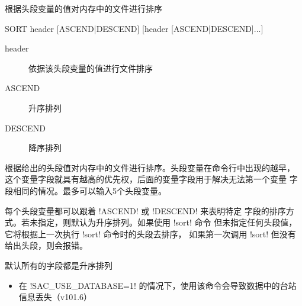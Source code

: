 \label{cmd:sort}

根据头段变量的值对内存中的文件进行排序

\begin{SACSTX}
SORT header [ASCEND|DESCEND] [header [ASCEND|DESCEND]...]
\end{SACSTX}

\begin{description}
\item [header] 依据该头段变量的值进行文件排序
\item [ASCEND] 升序排列
\item [DESCEND] 降序排列
\end{description}

根据给出的头段值对内存中的文件进行排序。头段变量在命令行中出现的越早，
这个变量字段就具有越高的优先权，后面的变量字段用于解决无法第一个变量
字段相同的情况。最多可以输入5个头段变量。

每个头段变量都可以跟着 !ASCEND! 或 !DESCEND! 来表明特定
字段的排序方式。若未指定，则默认为升序排列。如果使用 !sort! 命令
但未指定任何头段值，它将根据上一次执行 !sort! 命令时的头段去排序，
如果第一次调用 !sort! 但没有给出头段，则会报错。

默认所有的字段都是升序排列

\begin{itemize}
\item 在 !SAC_USE_DATABASE=1! 的情况下，使用该命令会导致数据中的台站信息丢失（v101.6）
\end{itemize}
